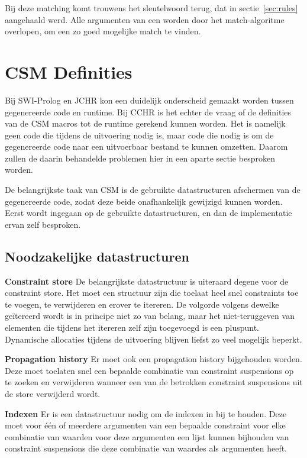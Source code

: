 Bij deze matching komt trouwens het sleutelwoord  terug, dat in sectie~\ref{sec:rules} aangehaald werd. Alle argumenten van een  worden door het match-algoritme overlopen, om een zo goed mogelijke match te vinden.

\section{CSM Definities} \label{sec:csmdef}

Bij SWI-Prolog en JCHR kon een duidelijk onderscheid gemaakt worden tussen gegenereerde code en runtime. Bij CCHR is het echter de vraag of de definities van de CSM macros tot de runtime gerekend kunnen worden. Het is namelijk geen code die tijdens de uitvoering nodig is, maar code die nodig is om de gegenereerde code naar een uitvoerbaar bestand te kunnen omzetten. Daarom zullen de daarin behandelde problemen hier in een aparte sectie besproken worden.

De belangrijkste taak van CSM is de gebruikte datastructuren afschermen van de gegenereerde code, zodat deze beide onafhankelijk gewijzigd kunnen worden. Eerst wordt ingegaan op de gebruikte datastructuren, en dan de implementatie ervan zelf besproken.

\subsection{Noodzakelijke datastructuren} \label{sec:datastruct}

{\bf Constraint store} De belangrijkste datastructuur is uiteraard degene voor de constraint store. Het moet een structuur zijn die toelaat heel snel constraints toe te voegen, te verwijderen en erover te itereren. De volgorde volgens dewelke ge\"itereerd wordt is in principe niet zo van belang, maar het niet-teruggeven van elementen die tijdens het itereren zelf zijn toegevoegd is een pluspunt. Dynamische allocaties tijdens de uitvoering blijven liefst zo veel mogelijk beperkt.

{\bf Propagation history} Er moet ook een propagation history bijgehouden worden. Deze moet toelaten snel een bepaalde combinatie van constraint suspensions op te zoeken en verwijderen wanneer een van de betrokken constraint suspensions uit de store verwijderd wordt.

{\bf Indexen} Er is een datastructuur nodig om de indexen in bij te houden. Deze moet voor \'e\'en of meerdere argumenten van een bepaalde constraint voor elke combinatie van waarden voor deze argumenten een lijst kunnen bijhouden van constraint suspensions die deze combinatie van waardes als argumenten heeft.
 
